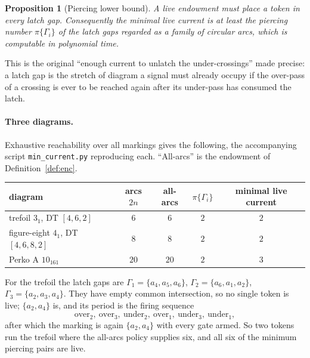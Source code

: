 \documentclass[11pt]{article}
\newtheorem{proposition}{Proposition}
\theoremstyle{definition}
\begin{document}
\begin{proposition}[Piercing lower bound]\label{prop:pierce}
A live endowment must place a token in every latch gap. Consequently the minimal
live current is at least the piercing number $\pi\{\Gamma_i\}$ of the latch gaps
regarded as a family of circular arcs, which is computable in polynomial time.
\end{proposition}

This is the original ``enough current to unlatch the under-crossings'' made
precise: a latch gap is the stretch of diagram a signal must already occupy if the
over-pass of a crossing is ever to be reached again after its under-pass has
consumed the latch.

\paragraph{Three diagrams.}
Exhaustive reachability over all markings gives the following, the accompanying
script \texttt{min\_current.py} reproducing each. ``All-arcs'' is the endowment of
Definition~\ref{def:enc}.

\begin{center}
\begin{tabular}{lcccc}
\hline
diagram & arcs $2n$ & all-arcs & $\pi\{\Gamma_i\}$ & minimal live current\\
\hline
trefoil $3_1$, DT $[4,6,2]$      & $6$  & $6$  & $2$ & $2$\\
figure-eight $4_1$, DT $[4,6,8,2]$ & $8$  & $8$  & $2$ & $2$\\
Perko A $10_{161}$               & $20$ & $20$ & $2$ & $3$\\
\hline
\end{tabular}
\end{center}

For the trefoil the latch gaps are $\Gamma_1=\{a_4,a_5,a_6\}$,
$\Gamma_2=\{a_6,a_1,a_2\}$, $\Gamma_3=\{a_2,a_3,a_4\}$. They have empty common
intersection, so no single token is live; $\{a_2,a_4\}$ is, and its period is the
firing sequence
\[
\mathrm{over}_2,\ \mathrm{over}_3,\ \mathrm{under}_2,\ \mathrm{over}_1,\
\mathrm{under}_3,\ \mathrm{under}_1,
\]
after which the marking is again $\{a_2,a_4\}$ with every gate armed. So two
tokens run the trefoil where the all-arcs policy supplies six, and all six of the
minimum piercing pairs are live.
\end{document}
